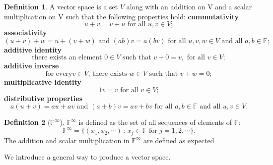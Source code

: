 \documentclass[paper=a4, fontsize=11pt]{scrartcl}
\numberwithin{equation}{section}		%
\numberwithin{figure}{section}			%
\numberwithin{table}{section}				%
\theoremstyle{definition}
\newtheorem{definition}{Definition}[section]
\theoremstyle{remark}
\theoremstyle{example}
\begin{document}
\begin{definition}
    A vector space is a set $V$ along with an addition on V and a scalar multiplication on V such that the following properties hold:
    \newline
    \textbf{commutativity}
    \begin{equation}
        u + v = v + u \text{ for all } u, v \in V;
    \end{equation}
    \textbf{associativity}
    \begin{equation}
        (u + v) + w = u + (v + w) \text{ and } (ab)v = a(bv) \text{ for all } u, v, w \in V \text{ and all } a, b \in \mathbb{F};
    \end{equation}
    \textbf{additive identity}
    \begin{equation}
        \text{there exists an element } 0 \in V \text{ such that } v + 0 = v, \text{ for all } v \in V;
    \end{equation}
    \textbf{additive inverse}
    \begin{equation}
        \text{for every} v \in V\text{, there exists }w \in V \text{ such that }v + w = 0;
    \end{equation}
    \textbf{multiplicative identity}
    \begin{equation}
        1v = v \text{ for all } v \in V;
    \end{equation}
    \textbf{distributive properties}
    \begin{equation}
        a(u + v) = au + av \text{ and } (a+b)v = av + bv \text{ for all } a,b \in \mathbb{F} \text{ and all } u,v \in V.
    \end{equation}
\end{definition}

\begin{definition}[$\mathbb{F}^{\infty}$]
    $\mathbb{F}^{\infty}$ is defined as the set of all sequences of elements of $\mathbb{F}$:
    \begin{equation}
        \mathbb{F}^{\infty} = \{(x_1,x_2,\cdots)\,:\,x_j\in\mathbb{F} \text{ for } j = 1,2,\cdots\}.
    \end{equation}
    The addition and scalar multiplication in $\mathbb{F}^{\infty}$ are defined as expected
\end{definition}

We introduce a general way to produce a vector space.
\end{document}
